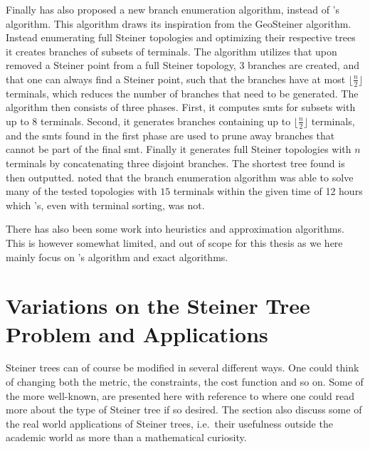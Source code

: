 Finally \textcite{fonseca2014} has also proposed a new branch enumeration
algorithm, instead of \citeauthor{smith1992}'s algorithm. This algorithm draws
its inspiration from the GeoSteiner algorithm. Instead enumerating full Steiner
topologies and optimizing their respective trees it creates branches of subsets
of terminals. The algorithm utilizes that upon removed a Steiner point from a
full Steiner topology, $3$ branches are created, and that one can always find a
Steiner point, such that the branches have at most $\lfloor \frac{n}{2} \rfloor$
terminals, which reduces the number of branches that need to be generated. The
algorithm then consists of three phases. First, it computes \acp{smt} for subsets
with up to $8$ terminals. Second, it generates branches containing up to
$\lfloor \frac{n}{2} \rfloor$ terminals, and the \acp{smt} found in the first
phase are used to prune away branches that cannot be part of the final
\ac{smt}. Finally it generates full Steiner topologies with $n$ terminals by
concatenating three disjoint branches. The shortest tree found is then
outputted. \citeauthor{fonseca2014} noted that the branch enumeration algorithm
was able to solve many of the tested topologies with $15$ terminals within the
given time of 12 hours which \citeauthor{smith1992}'s, even with terminal
sorting, was not.

There has also been some work into heuristics and approximation algorithms. This
is however somewhat limited, and out of scope for this thesis as we here mainly
focus on \citeauthor{smith1992}'s algorithm and exact algorithms.

\section{Variations on the Steiner Tree Problem and Applications}
\label{sec:vari-stein-tree}

Steiner trees can of course be modified in several different ways. One could
think of changing both the metric, the constraints, the cost function and so
on. Some of the more well-known, are presented here with reference to where one
could read more about the type of Steiner tree if so desired. The section also
discuss some of the real world applications of Steiner trees, i.e.\ their
usefulness outside the academic world as more than a mathematical curiosity.

